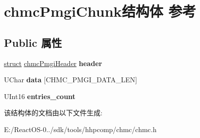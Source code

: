 \hypertarget{structchmc_pmgi_chunk}{}\section{chmc\+Pmgi\+Chunk结构体 参考}
\label{structchmc_pmgi_chunk}
\subsection*{Public 属性}
\begin{DoxyCompactItemize}
\item 
\mbox{\label{structchmc_pmgi_chunk_abeaccb01949fc3b2ad1412463cc83065}} 
\hyperlink{interfacestruct}{struct} \hyperlink{structchmc_pmgi_header}{chmc\+Pmgi\+Header} {\bfseries header}
\item 
\mbox{\label{structchmc_pmgi_chunk_a08cd0471cd9bd900fa240a92ca0b015d}} 
U\+Char {\bfseries data} \mbox{[}C\+H\+M\+C\+\_\+\+P\+M\+G\+I\+\_\+\+D\+A\+T\+A\+\_\+\+L\+EN\mbox{]}
\item 
\mbox{\label{structchmc_pmgi_chunk_a032b0a36d09966286f61826562c9fbea}} 
U\+Int16 {\bfseries entries\+\_\+count}
\end{DoxyCompactItemize}


该结构体的文档由以下文件生成\+:\begin{DoxyCompactItemize}
\item 
E\+:/\+React\+O\+S-\/0../sdk/tools/hhpcomp/chmc/chmc.\+h\end{DoxyCompactItemize}
